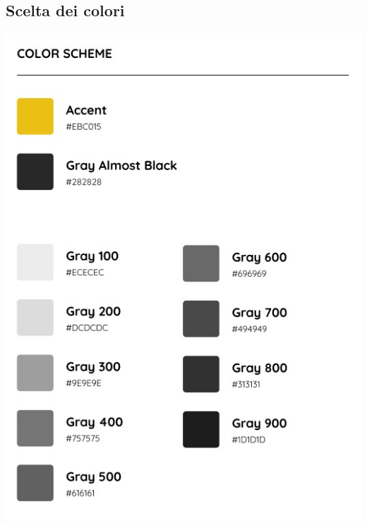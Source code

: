 \documentclass{article}
\begin{document}
\begin{large}
    \section{Scelta dei colori}
        \begin{center}
            \includegraphics[scale=0.75]{teraware/colors.jpeg} 
        \end{center}
\end{large}
\end{document}
